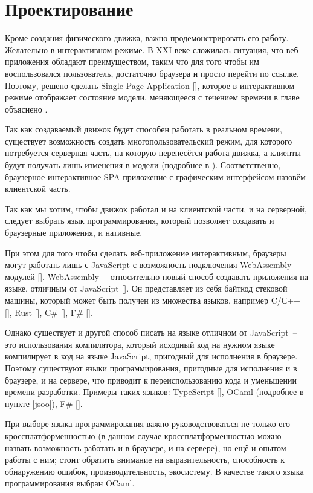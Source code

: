 \chapter{Проектирование}

\TODO

Кроме создания физического движка, важно продемонстрировать его работу.
Желательно в интерактивном режиме. В XXI веке сложилась ситуация, что веб-приложения
обладают преимуществом, таким что для того чтобы им воспользовался пользователь, достаточно
браузера и просто перейти по ссылке.
Поэтому, решено сделать Single Page Application [\TODO],
которое в интерактивном режиме отображает состояние модели, меняющееся с течением времени
в главе \TODO объяснено \TODO.

Так как создаваемый движок будет способен работать в реальном времени, существует возможность
создать многопользовательский режим, для которого потребуется серверная часть,
на которую перенесётся работа движка, а клиенты будут получать лишь изменения в модели (подробнее в \TODO).
Соответственно, браузерное интерактивное SPA приложение с графическим интерфейсом назовём клиентской часть.

Так как мы хотим, чтобы движок работал и на клиентской части, и на серверной, следует выбрать язык программирования,
который позволяет создавать и браузерные приложения, и нативные.

При этом для того чтобы сделать веб-приложение интерактивным, браузеры могут работать лишь с JavaScript
с возможность подключения WebAssembly-модулей [\TODO]. WebAssembly~-- относительно новый способ создавать
приложения на языке, отличным от JavaScript [\TODO]. Он представляет из себя байткод стековой машины,
который может быть получен из множества языков, например C/С++ [\TODO], Rust [\TODO], C\# [\TODO], F\# [\TODO].

Однако существует и другой способ
писать на языке отличном от JavaScript~-- это использования компилятора, который исходный код на нужном языке
компилирует в код на языке JavaScript, пригодный для исполнения в браузере. Поэтому существуют языки программирования,
пригодные для исполнения и в браузере, и на сервере, что приводит к переиспользованию кода и уменьшении времени разработки.
Примеры таких языков: TypeScript [\TODO], OCaml (подробнее в пункте \ref{jsoo}), F\# [\TODO].

При выборе языка программирования важно руководствоваться не только его кроссплатформенностью
(в данном случае кроссплатформенностью можно назвать возможность работать и в браузере, и на сервере),
но ещё и опытом работы с ним; стоит обратить внимание на выразительность, способность к обнаружению ошибок,
производительность, экосистему. В качестве такого языка программирования выбран OCaml.

